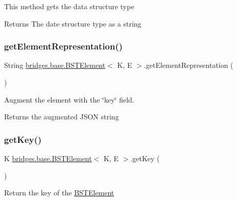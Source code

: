 This method gets the data structure type

\begin{DoxyReturn}{Returns}
The date structure type as a string 
\end{DoxyReturn}
\mbox{\label{classbridges_1_1base_1_1_b_s_t_element_a0619c81bb38df6fc64a651a909f64d84}} 
\subsubsection{\texorpdfstring{get\+Element\+Representation()}{getElementRepresentation()}}
{\footnotesize\ttfamily String \mbox{\hyperlink{classbridges_1_1base_1_1_b_s_t_element}{bridges.\+base.\+B\+S\+T\+Element}}$<$ K, E $>$.get\+Element\+Representation (\begin{DoxyParamCaption}{ }\end{DoxyParamCaption})}

Augment the element with the \char`\"{}key\char`\"{} field.

\begin{DoxyReturn}{Returns}
the augmented J\+S\+ON string 
\end{DoxyReturn}
\mbox{\label{classbridges_1_1base_1_1_b_s_t_element_afba950fad36d3327b01003df3ba4cc9f}} 
\subsubsection{\texorpdfstring{get\+Key()}{getKey()}}
{\footnotesize\ttfamily K \mbox{\hyperlink{classbridges_1_1base_1_1_b_s_t_element}{bridges.\+base.\+B\+S\+T\+Element}}$<$ K, E $>$.get\+Key (\begin{DoxyParamCaption}{ }\end{DoxyParamCaption})}

Return the key of the \mbox{\hyperlink{classbridges_1_1base_1_1_b_s_t_element}{B\+S\+T\+Element}}

